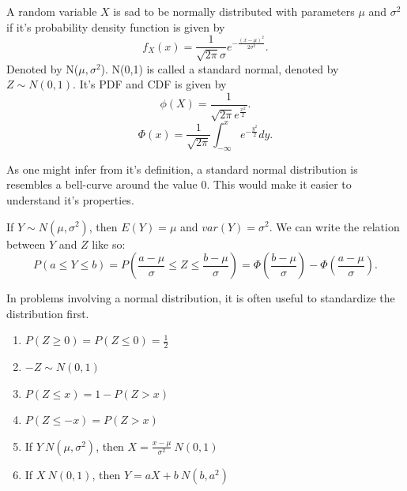 \documentclass[5pt, a4paper]{article}
\begin{document}
    \begin{tcolorbox}[title=Normal Distribution]
        A random variable $X$ is sad to be normally distributed with parameters
         $\mu$ and $\sigma^2$ if it's probability density function is given by
          \[
              f_X(x) = \frac{1}{\sqrt{2\pi}\sigma
              }e^{-\frac{(x-\mu)^2}{2\sigma^2}}
         .\]
         Denoted by N($\mu,\sigma^2$).
         N(0,1) is called a standard normal, denoted by $Z \sim N(0,1)$. It's PDF
         and CDF is given by  \[
             \phi(X) = \frac{1}{\sqrt{2\pi}e^{\frac{x^2}{2}} }
         .\] 
         \[
             \Phi(x) = \frac{1}{\sqrt{2\pi} } \int_{-\infty}^{x}
             e^{-\frac{y^2}{2}}dy
         .\] 
    \end{tcolorbox}
    \begin{tcolorbox}[colframe=blue!20!white]
        As one might infer from it's definition, a standard normal distribution
        is resembles a bell-curve around the value 0. This would make it easier
        to understand it's properties.
    \end{tcolorbox}
    \begin{tcolorbox}[title=Normal Distribution Property, colframe=blue!20!white]
        If $Y \sim  N(\mu,\sigma^2)$, then $E(Y) = \mu$ and $var(Y) = \sigma^2$. We
        can write the relation between $Y$ and $Z$ like so: \[
        P(a \le Y\le b) = P(\frac{a-\mu}{\sigma} \le Z \le \frac{b -
        \mu}{\sigma}) = \Phi(\frac{b-\mu}{\sigma}) - \Phi(\frac{a-\mu}{\sigma})
        .\] 
    \end{tcolorbox}
    \begin{tcolorbox}[colframe=blue!20!white]
        In problems involving a normal distribution, it is often useful to
        standardize the distribution first.
    \end{tcolorbox}
    \begin{tcolorbox}[title=Standard Normal Distribution Properties,
        colframe=blue!20!white]
        \begin{enumerate}
            \item $P(Z \ge 0) = P(Z \le 0) = \frac{1}{2}$
            \item $-Z \sim N(0,1)$ 
            \item $P(Z\le x) = 1 - P(Z > x)$
            \item $P(Z \le -x) = P(Z > x)$
            \item If $Y~N(\mu,\sigma^2)$, then $X = \frac{x- \mu}{\sigma^2} ~
                N(0,1)$
            \item If $X ~ N(0,1)$, then $Y=aX + b ~ N(b,a^2)$
        \end{enumerate}
    \end{tcolorbox}
\end{document}
